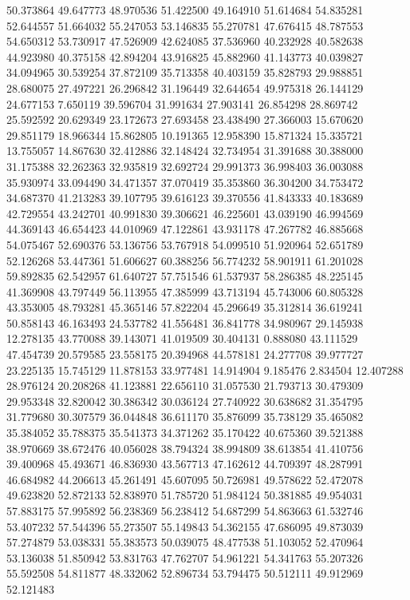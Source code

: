 50.373864
49.647773
48.970536
51.422500
49.164910
51.614684
54.835281
52.644557
51.664032
55.247053
53.146835
55.270781
47.676415
48.787553
54.650312
53.730917
47.526909
42.624085
37.536960
40.232928
40.582638
44.923980
40.375158
42.894204
43.916825
45.882960
41.143773
40.039827
34.094965
30.539254
37.872109
35.713358
40.403159
35.828793
29.988851
28.680075
27.497221
26.296842
31.196449
32.644654
49.975318
26.144129
24.677153
7.650119
39.596704
31.991634
27.903141
26.854298
28.869742
25.592592
20.629349
23.172673
27.693458
23.438490
27.366003
15.670620
29.851179
18.966344
15.862805
10.191365
12.958390
15.871324
15.335721
13.755057
14.867630
32.412886
32.148424
32.734954
31.391688
30.388000
31.175388
32.262363
32.935819
32.692724
29.991373
36.998403
36.003088
35.930974
33.094490
34.471357
37.070419
35.353860
36.304200
34.753472
34.687370
41.213283
39.107795
39.616123
39.370556
41.843333
40.183689
42.729554
43.242701
40.991830
39.306621
46.225601
43.039190
46.994569
44.369143
46.654423
44.010969
47.122861
43.931178
47.267782
46.885668
54.075467
52.690376
53.136756
53.767918
54.099510
51.920964
52.651789
52.126268
53.447361
51.606627
60.388256
56.774232
58.901911
61.201028
59.892835
62.542957
61.640727
57.751546
61.537937
58.286385
48.225145
41.369908
43.797449
56.113955
47.385999
43.713194
45.743006
60.805328
43.353005
48.793281
45.365146
57.822204
45.296649
35.312814
36.619241
50.858143
46.163493
24.537782
41.556481
36.841778
34.980967
29.145938
12.278135
43.770088
39.143071
41.019509
30.404131
0.888080
43.111529
47.454739
20.579585
23.558175
20.394968
44.578181
24.277708
39.977727
23.225135
15.745129
11.878153
33.977481
14.914904
9.185476
2.834504
12.407288
28.976124
20.208268
41.123881
22.656110
31.057530
21.793713
30.479309
29.953348
32.820042
30.386342
30.036124
27.740922
30.638682
31.354795
31.779680
30.307579
36.044848
36.611170
35.876099
35.738129
35.465082
35.384052
35.788375
35.541373
34.371262
35.170422
40.675360
39.521388
38.970669
38.672476
40.056028
38.794324
38.994809
38.613854
41.410756
39.400968
45.493671
46.836930
43.567713
47.162612
44.709397
48.287991
46.684982
44.206613
45.261491
45.607095
50.726981
49.578622
52.472078
49.623820
52.872133
52.838970
51.785720
51.984124
50.381885
49.954031
57.883175
57.995892
56.238369
56.238412
54.687299
54.863663
61.532746
53.407232
57.544396
55.273507
55.149843
54.362155
47.686095
49.873039
57.274879
53.038331
55.383573
50.039075
48.477538
51.103052
52.470964
53.136038
51.850942
53.831763
47.762707
54.961221
54.341763
55.207326
55.592508
54.811877
48.332062
52.896734
53.794475
50.512111
49.912969
52.121483
